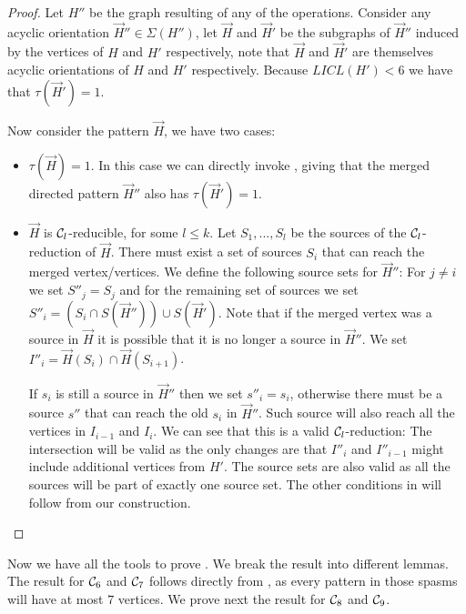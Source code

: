 \documentclass[a4paper,UKenglish,cleveref, autoref, numberwithinsect, thm-restate]{lipics-v2021}
\newcommand{\reducible}[1]{${#1}$-reducible}
\newcommand{\cycle}[1]{\cC_{#1}}
\newcommand{\LICL}{LICL}
\newcommand{\dtw}{\tau}
\newcommand{\cC}{{\cal C}}
\begin{document}
	\begin{proof}
		
		Let $H''$ be the graph resulting of any of the operations. Consider any acyclic orientation $\vec{H}'' \in \Sigma(H'')$, let $\vec{H}$ and $\vec{H}'$ be the subgraphs of $\vec{H}''$ induced by the vertices of $H$ and $H'$ respectively, note that $\vec{H}$ and $\vec{H}'$ are themselves acyclic orientations of $H$ and $H'$ respectively. Because $\LICL(H') < 6$ we have that $\dtw(\vec{H}') = 1$.
		
		Now consider the pattern $\vec{H}$, we have two cases:
		\begin{itemize}
			\item $\dtw(\vec{H}) = 1$. In this case we can directly invoke , giving that the merged directed pattern $\vec{H}''$ also has $\dtw(\vec{H}') = 1$.
			
			\item $\vec{H}$ is \reducible{\cycle{l}}, for some $l \leq k$. Let $S_1,...,S_l$ be the sources of the $\cycle{l}$-reduction of $\vec{H}$. There must exist a set of sources $S_i$ that can reach the merged vertex/vertices. We define the following source sets for $\vec{H}''$: For $j\neq i$ we set $S''_j=S_j$ and for the remaining set of sources we set $S''_i = (S_i \cap S(\vec{H}'')) \cup S(\vec{H}')$. Note that if the merged vertex was a source in $\vec{H}$ it is possible that it is no longer a source in $\vec{H}''$. We set $I''_i = \vec{H}(S_{i})\cap \vec{H}(S_{i+1})$.
			
			If $s_i$ is still a source in $\vec{H}''$ then we set $s''_i = s_i$, otherwise there must be a source $s''$ that can reach the old $s_i$ in $\vec{H}''$. Such source will also reach all the vertices in $I_{i-1}$ and $I_{i}$. We can see that this is a valid $\cycle{l}$-reduction: The intersection will be valid as the only changes are that $I''_{i}$ and $I''_{i-1}$ might include additional vertices from $H'$. The source sets are also valid as all the sources will be part of exactly one source set. The other conditions in  will follow from our construction.
		\end{itemize}
	\end{proof}
	
	Now we have all the tools to prove . We break the result into different lemmas. The result for $\cycle{6}$ and $\cycle{7}$ follows directly from , as every pattern in those spasms will have at most $7$ vertices. We prove next the result for $\cycle{8}$ and $\cycle{9}$.
	
\end{document}
